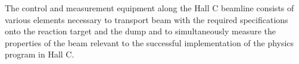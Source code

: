 
The control and measurement equipment along the Hall C beamline consists of
various elements necessary to transport beam with the required specifications
onto the reaction target and the dump and to simultaneously measure the
properties of the beam relevant to the successful implementation of the
physics program in Hall C.

